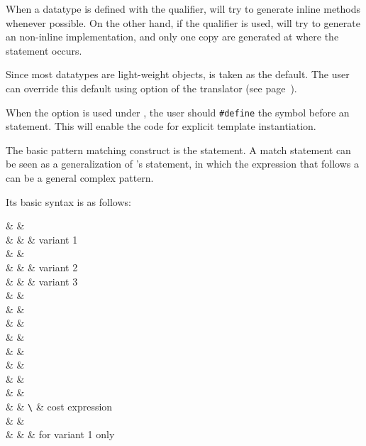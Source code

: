 \begin{Tips}
   When a datatype is defined with the  qualifier,
\Prop{} will try to generate inline methods whenever possible.
On the other hand, if the  qualifier is used, \Prop{}
will try to generate an non-inline implementation, and only one
copy are generated at where the  statement occurs.

Since most \Prop{} datatypes are light-weight objects,  is taken
as the default.  The user can override this default using
 option of the translator 
(see page~\pageref{option:save-space}).
\end{Tips}

\begin{Tips}
   When the option  is used
under \Gpp, the user should \verb|#define| the symbol
 before
an  statement.   
This will enable the code for explicit template instantiation.
\end{Tips}

 \label{sec:pattern-matching}
   The basic pattern matching construct is the  statement.    
A match statement can be seen as a generalization of \Cpp's 
statement, in which the expression that follows a  can be
a general complex pattern.  

   Its basic syntax is as follows:
\begin{syntax}
 & \IS & 
      \\
        & & \T{\{}  \T{\}} & variant 1 \\
          & \OR & 
     \\
        & & \T{\{}  \T{\}} & variant 2 \\
          & \OR &
      & variant 3 \\
        & & \quad {} \\
        & &   \T{;} \\
 & \IS &   \\
                & \OR &   \\
 & \IS & \Pat {} 
        \T{:}  \\
       & \IS &   \\
                & \OR &   \\
                & \OR & \T{|}  \\
 & \IS & \verb|\| \Exp & cost expression \\
 & \IS & \T{\{}  \T{\}} \\
                  & \OR &  & for variant 1 only \\
\end{syntax}

